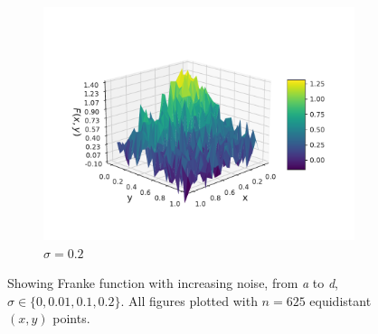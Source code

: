 \documentclass[twocolumn,english,notitlepage]{article}
\begin{document}
\begin{appendices}
\begin{figure}
\begin{subfigure}{.5\textwidth}
                \includegraphics[width=\linewidth]{franke_functions_0_2.pdf}
                \caption{$\sigma = 0.2$}

            \end{subfigure}
        
            \caption{Showing Franke function with increasing noise, from \textit{a} to \textit{d}, $\sigma \in \{ 0, 0.01, 0.1, 0.2\}$. All figures plotted with $n = 625$ equidistant $(x,y)$ points.}\label{app:fig:frankefunction varying noise}
        \end{figure}

    

\end{appendices}
\end{document}
